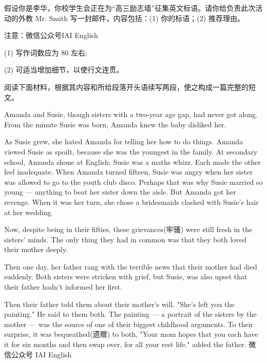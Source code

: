 \documentclass{英语试卷}
\begin{document}
\par 假设你是李华，你校学生会正在为“高三励志墙”征集英文标语。请你给负责此次活动的外教 Mr. Smith 写一封邮件，内容包括：(1) 你的标语；(2) 推荐理由。\par
\par 注意：微信公众号IAI English\par
\par (1) 写作词数应为 80 左右;\par
\par (2) 可适当增加细节，以使行文连贯。\par
{}
\par 阅读下面材料，根据其内容和所给段落开头语续写两段，使之构成一篇完整的短文。\par
\par Amanda and Susie, though sisters with a two-year age gap, had never got along. From the minute Susie was born, Amanda knew the baby disliked her.\par
\par As Susie grew, she hated Amanda for telling her how to do things. Amanda viewed Susie as spoilt, because she was the youngest in the family. At secondary school, Amanda shone at English; Susie was a maths whizz. Each made the other feel inadequate. When Amanda turned fifteen, Susie was angry when her sister was allowed to go to the youth club disco. Perhaps that was why Susie married so young — anything to beat her sister down the aisle. But Amanda got her revenge. When it was her turn, she chose a bridesmaids clashed with Susie's hair at her wedding.\par
\par Now, despite being in their fifties, these grievances(牢骚) were still fresh in the sisters' minds. The only thing they had in common was that they both loved their mother deeply.\par
\par Then one day, her father rang with the terrible news that their mother had died suddenly. Both sisters were stricken with grief, but Susie, was also upset that their father hadn't informed her first.\par
\par Then their father told them about their mother's will. "She’s left you the painting." He said to them both. The painting — a portrait of the sisters by the mother — was the source of one of their biggest childhood arguments. To their surprise, it was bequeathed(遗赠) to both, "Your mom hopes that you each have it for six months and then swap over, for all your rest life." added the father. 微信公众号 IAI English\par
\end{document}
